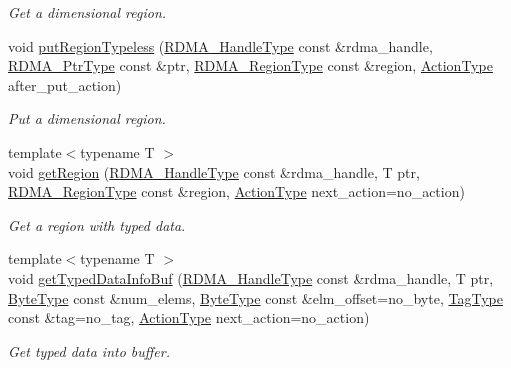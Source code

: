\begin{DoxyCompactItemize}
\begin{DoxyCompactList}\small\item\em Get a dimensional region. \end{DoxyCompactList}\item 
void \hyperlink{structvt_1_1rdma_1_1_r_d_m_a_manager_a2e34becca8d5f72a7d460e6574f8f623}{put\+Region\+Typeless} (\hyperlink{namespacevt_a10442579ec4e7ebef223818e64bcf908}{R\+D\+M\+A\+\_\+\+Handle\+Type} const \&rdma\+\_\+handle, \hyperlink{namespacevt_aab05b4a584f7ee835a6d0f66915cf59b}{R\+D\+M\+A\+\_\+\+Ptr\+Type} const \&ptr, \hyperlink{structvt_1_1rdma_1_1_r_d_m_a_manager_aafc574f533ebf5b34c1389ef504448bf}{R\+D\+M\+A\+\_\+\+Region\+Type} const \&region, \hyperlink{namespacevt_ae0a5a7b18cc99d7b732cb4d44f46b0f3}{Action\+Type} after\+\_\+put\+\_\+action)
\begin{DoxyCompactList}\small\item\em Put a dimensional region. \end{DoxyCompactList}\item 
{\footnotesize template$<$typename T $>$ }\\void \hyperlink{structvt_1_1rdma_1_1_r_d_m_a_manager_a06506f3abad91d02456d88f4b1e4db1b}{get\+Region} (\hyperlink{namespacevt_a10442579ec4e7ebef223818e64bcf908}{R\+D\+M\+A\+\_\+\+Handle\+Type} const \&rdma\+\_\+handle, T ptr, \hyperlink{structvt_1_1rdma_1_1_r_d_m_a_manager_aafc574f533ebf5b34c1389ef504448bf}{R\+D\+M\+A\+\_\+\+Region\+Type} const \&region, \hyperlink{namespacevt_ae0a5a7b18cc99d7b732cb4d44f46b0f3}{Action\+Type} next\+\_\+action=no\+\_\+action)
\begin{DoxyCompactList}\small\item\em Get a region with typed data. \end{DoxyCompactList}\item 
{\footnotesize template$<$typename T $>$ }\\void \hyperlink{structvt_1_1rdma_1_1_r_d_m_a_manager_a267d1a2da52abf259119da964b9051f0}{get\+Typed\+Data\+Info\+Buf} (\hyperlink{namespacevt_a10442579ec4e7ebef223818e64bcf908}{R\+D\+M\+A\+\_\+\+Handle\+Type} const \&rdma\+\_\+handle, T ptr, \hyperlink{namespacevt_aab8d55968084610ce3b17057981e9300}{Byte\+Type} const \&num\+\_\+elems, \hyperlink{namespacevt_aab8d55968084610ce3b17057981e9300}{Byte\+Type} const \&elm\+\_\+offset=no\+\_\+byte, \hyperlink{namespacevt_a84ab281dae04a52a4b243d6bf62d0e52}{Tag\+Type} const \&tag=no\+\_\+tag, \hyperlink{namespacevt_ae0a5a7b18cc99d7b732cb4d44f46b0f3}{Action\+Type} next\+\_\+action=no\+\_\+action)
\begin{DoxyCompactList}\small\item\em Get typed data into buffer. \end{DoxyCompactList}\item 

\end{DoxyCompactItemize}
